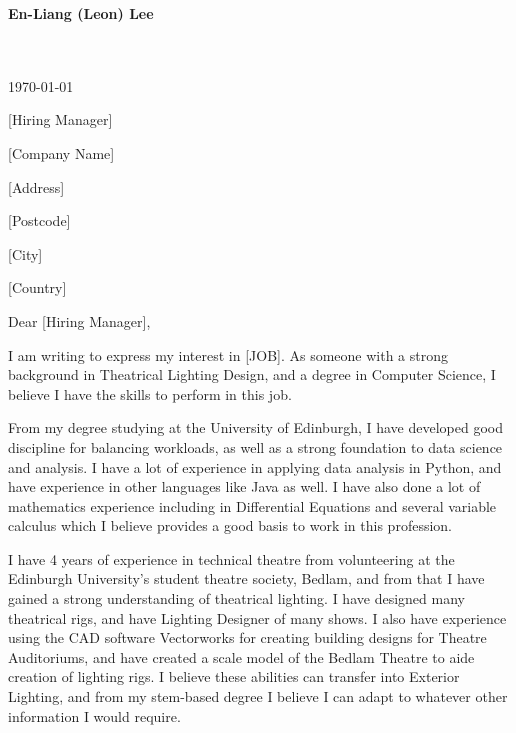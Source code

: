 \documentclass[10pt,english]{article}
\begin{document}
\setlength{\columnsep}{2.2em}
\setlength{\columnseprule}{4pt}



\newpage

\setlength{\columnsep}{2.2em}
\setlength{\columnseprule}{4pt}

\begin{minipage}[c][2.5cm][c]{1\mpwidth}
	\LARGE{\textbf{\textcolor{maincol}{En-Liang (Leon) Lee}}} \\[2pt]
	\normalsize{}\\
	\\
\end{minipage}

\bigskip

\begin{minipage}[c][2.5cm][c]{1\mpwidth}
	\today
	\bigskip

	[Hiring Manager]

	[Company Name]

	[Address]

	[Postcode]

	[City]

	[Country]
\end{minipage}
\bigskip\bigskip

Dear [Hiring Manager],
\medskip

I am writing to express my interest in [JOB]. As someone with a strong background in Theatrical Lighting Design, and a degree in Computer Science, I believe I have the skills to perform in this job.

\medskip

From my degree studying at the University of Edinburgh, I have developed good discipline for balancing workloads, as well as a strong foundation to data science and analysis. I have a lot of experience in applying data analysis in Python, and have experience in other languages like Java as well. I have also done a lot of mathematics experience including in Differential Equations and several variable calculus which I believe provides a good basis to work in this profession.

\medskip

I have 4 years of experience in technical theatre from volunteering at the Edinburgh University's student theatre society, Bedlam, and from that I have gained a strong understanding of theatrical lighting. I have designed many theatrical rigs, and have Lighting Designer of many shows. I also have experience using the CAD software Vectorworks for creating building designs for Theatre Auditoriums, and have created a scale model of the Bedlam Theatre to aide creation of lighting rigs. I believe these abilities can transfer into Exterior Lighting, and from my stem-based degree I believe I can adapt to whatever other information I would require.
\end{document}
